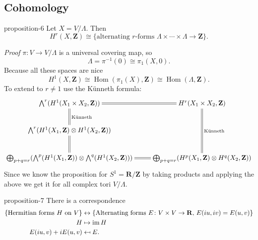 \documentclass[10pt,]{book}
\makeatletter
\renewcommand*{\proofname}{Proof}
\renewenvironment{proof}[1][\proofname]{\par
  \pushQED{\qed}%
  \normalfont \topsep6\p@\@plus6\p@\relax
  \trivlist
  \item\relax
    {\itshape
    #1\@addpunct{.}}\hspace\labelsep\ignorespaces
}{%
  \popQED\endtrivlist\@endpefalse
}
\numberwithin{equation}{section}
\providecommand\mapsfrom{\mathrel{\reflectbox{\ensuremath{\mapsto}}}}
\newcommand{\ZZ}{\mathbf{Z}}
\newcommand{\RR}{\mathbf{R}}
\DeclareMathOperator{\Hom}{Hom}
\DeclareMathOperator{\im}{im}
\newcommand{\amp}{&}
\makeatother
\begin{document}
\subsection[{Cohomology}]{Cohomology}\label{subsection-5}
\begin{proposition}{}{}{proposition-6}%
\hypertarget{p-54}{}%
Let \(X = V/\Lambda\). Then%
\begin{equation*}
H^r (X,\ZZ) \cong \{\text{alternating }r\text{-forms } \Lambda\times\cdots\times\Lambda\to \ZZ\}\text{.}
\end{equation*}
%
\end{proposition}
\begin{proof}\hypertarget{proof-10}{}
\hypertarget{p-55}{}%
\(\pi\colon V\to V/\Lambda\) is a universal covering map, so%
\begin{equation*}
\Lambda = \pi^{-1} (0 ) \cong \pi_1(X,0)\text{.}
\end{equation*}
Because all these spaces are nice%
\begin{equation*}
H^1 (X,\ZZ) \cong \Hom(\pi_1(X), \ZZ) \cong \Hom(\Lambda, \ZZ)\text{.}
\end{equation*}
To extend to \(r \ne 1\) use the Künneth formula:%
\begin{equation*}
\xymatrix{
\bigwedge^r(H^1(X_1\times X_2, \ZZ)) \ar@{=}[r]\ar@{=}[d]^{\text{Künneth}} & H^r(X_1\times X_2 , \ZZ)\ar@{=}[dd]^{\text{Künneth}}\\
\bigwedge^r(H^1(X_1, \ZZ)\otimes H^1(X_2, \ZZ)) \ar@{=}[d]& \\
\bigoplus_{p+q=r}(\bigwedge^p(H^1(X_1, \ZZ))\otimes\bigwedge^q(H^1(X_2, \ZZ))) \ar@{=}[r] & \bigoplus_{p+q=r}(H^p(X_1, \ZZ)\otimes H^q(X_2, \ZZ))
}
\end{equation*}
Since we know the proposition for \(S^1 = \RR/\ZZ\) by taking products and applying the above we get it for all complex tori \(V/\Lambda\).%
\end{proof}
\begin{proposition}{}{}{proposition-7}%
\hypertarget{p-56}{}%
There is a correspondence%
\begin{align*}
\{\text{Hermitian forms }H \text{ on } V\} \amp\leftrightarrow\{\text{Alternating forms }E\colon V\times V\to\RR,\,E(iu,iv) = E(u,v)\}\\
H\amp\mapsto \im H\\
E(iu,v)+ i E(u,v) \amp\mapsfrom E\text{.}
\end{align*}
%
\end{proposition}
%
%
\typeout{************************************************}
\typeout{************************************************}
%
\end{document}
